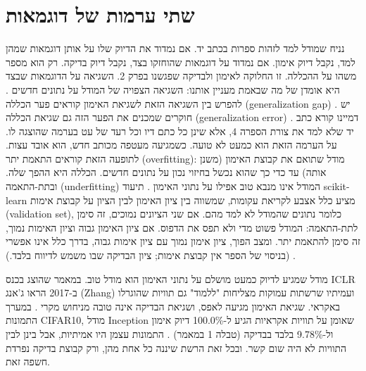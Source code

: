 \section{שתי ערמות של דוגמאות}
נניח שמודל למד לזהות ספרות בכתב יד. אם נמדוד את הדיוק שלו על אותן דוגמאות שמהן למד, נקבל דיוק אימון. אם נמדוד על דוגמאות שהוחזקו בצד, נקבל דיוק בדיקה. רק הוא מספר משהו על ההכללה. זו החלוקה לאימון ולבדיקה שפגשנו בפרק 2. השגיאה על הדוגמאות שבצד היא אומדן של מה שבאמת מעניין אותנו: השגיאה הצפויה של המודל על נתונים חדשים \cite{S-ch05-13}. להפרש בין השגיאה הזאת לשגיאת האימון קוראים פער הכללה (generalization gap) \cite{S-ch05-12}. יש חוקרים שמכנים את הפער הזה גם שגיאת הכללה (generalization error) \cite{S-ch05-10,S-ch05-12}.
דמיינו קורא כתב יד שלא למד את צורת הספרה 4, אלא שינן כל כתם דיו וכל רעד של עט בערמה שהוצגה לו. על הערמה הזאת הוא כמעט לא טועה. כשמגיעה מעטפה מכותב חדש, הוא אובד עצות. לתופעה הזאת קוראים התאמת יתר (overfitting): מודל שתואם את קבוצת האימון (משנן אותה) עד כדי כך שהוא נכשל בחיזוי נכון על נתונים חדשים. הכללה היא ההפך שלה. ובתת-התאמה (underfitting) המודל אינו מנבא טוב אפילו על נתוני האימון \cite{S-ch05-08}.
תיעוד scikit-learn מציע כלל אצבע לקריאת עקומות, שמשווה בין ציון האימון לבין הציון על קבוצת אימות (validation set), כלומר נתונים שהמודל לא למד מהם. אם שני הציונים נמוכים, זה סימן לתת-התאמה: המודל פשוט מדי ולא תפס את הדפוס. אם ציון האימון גבוה וציון האימות נמוך, זה סימן להתאמת יתר. ומצב הפוך, ציון אימון נמוך עם ציון אימות גבוה, בדרך כלל אינו אפשרי \cite{S-ch05-02}. (בניסוי של הספר אין קבוצת אימות; ציון הבדיקה שבו משמש לדיווח בלבד.)
\begin{mythbox}
\mythlabel מודל שמגיע לדיוק כמעט מושלם על נתוני האימון הוא מודל טוב.
\tcblower
\realitylabel במאמר שהוצג בכנס ICLR ב-2017 הראו ג'אנג (Zhang) ועמיתיו שרשתות עמוקות מצליחות "ללמוד" גם תוויות שהוגרלו באקראי. שגיאת האימון מגיעה לאפס, ושגיאת הבדיקה אינה טובה מניחוש מקרי \cite{S-ch05-10}. במערך התמונות CIFAR10, מודל Inception שאומן על תוויות אקראיות הגיע ל-100.0\% דיוק אימון ול-9.78\% בלבד בבדיקה (טבלה 1 במאמר) \cite{S-ch05-10}. התמונות עצמן היו אמיתיות, אבל בינן לבין התוויות לא היה שום קשר. ובכל זאת הרשת שיננה כל אחת מהן, ורק קבוצת בדיקה נפרדת חשפה זאת.
\end{mythbox}
